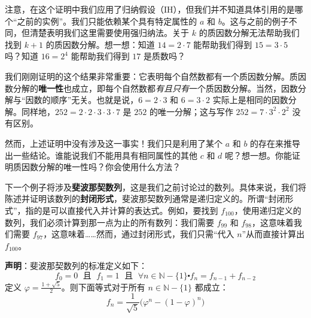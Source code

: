 注意，在这个证明中我们应用了归纳假设（IH），但我们并不知道具体引用的是哪个``之前的实例''。我们只能依赖某个具有特定属性的 $a$ 和 $b$。这与之前的例子不同，但清楚表明我们这里需要使用强归纳法。关于 $k$ 的质因数分解无法帮助我们找到 $k+1$ 的质因数分解。想一想：知道 $14 = 2 \cdot 7$ 能帮助我们得到 $15 = 3 \cdot 5$ 吗？知道 $16 = 2^4$ 能帮助我们得到 $17$ 是质数吗？

我们刚刚证明的这个结果非常重要：它表明每个自然数都有一个质因数分解。质因数分解的\textbf{唯一性}也成立，即每个自然数都\emph{有且只有}一个质因数分解。当然，因数分解与``因数的顺序''无关。也就是说，$6 = 2 \cdot 3$ 和 $6 = 3 \cdot 2$ 实际上是相同的因数分解。同样地，$252 = 2 \cdot 2 \cdot 3 \cdot 3 \cdot 7$ 是 $252$ 的唯一分解；这与写作 $252 = 7 \cdot 3^2 \cdot 2^2$ 没有区别。

然而，上述证明中没有涉及这一事实！我们只是利用了某个 $a$ 和 $b$ 的存在来推导出一些结论。谁能说我们不能用具有相同属性的其他 $c$ 和 $d$ 呢？想一想。你能证明质因数分解的唯一性吗？你会使用什么方法？

下一个例子将涉及\textbf{斐波那契数列}，这是我们之前讨论过的数列。具体来说，我们将陈述并证明该数列的\textbf{封闭形式}，斐波那契数列通常是递归定义的。所谓``封闭形式''，指的是可以直接代入并计算的表达式。例如，要找到 $f_100$，使用递归定义的数列，我们必须计算到那一点为止的所有数列：我们需要 $f_99$ 和 $f_98$，这意味着我们需要 $f_97$，这意味着……然而，通过封闭形式，我们只需``代入 $n$''从而直接计算出 $f_100$。\\

\begin{example}[斐波那契数列的封闭形式]

    \textbf{声明}：斐波那契数列的标准定义如下：
    \[f_0 = 0 \;\text{ 且 }\; f_1 = 1 \;\text{ 且 }\; \forall n \in \mathbb{N}-\{1\} \centerdot f_n = f_{n-1} + f_{n-2}\]
    定义 $\varphi = \frac{1+\sqrt{5}}{2}$。则下面等式对于所有 $n \in \mathbb{N}-\{1\}$ 都成立：
    \[f_n = \frac{1}{\sqrt{5}}\big(\varphi^n-(1-\varphi)^n\big)\]
\end{example}

